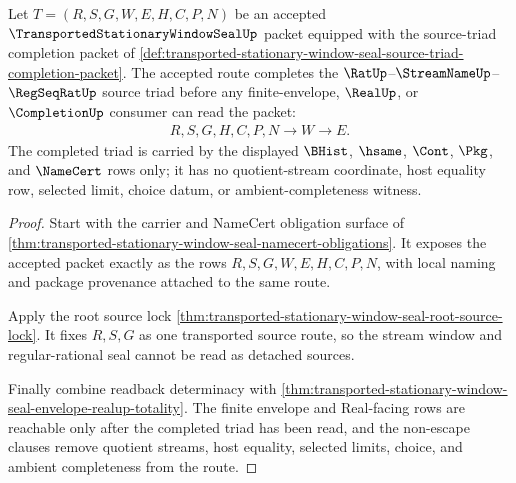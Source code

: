 \begin{theorem}
\label{thm:transported-stationary-window-seal-source-triad-completion}
Let $T=(R,S,G,W,E,H,C,P,N)$ be an accepted $\TransportedStationaryWindowSealUp$ packet equipped with the source-triad completion packet of \autoref{def:transported-stationary-window-seal-source-triad-completion-packet}. The accepted route completes the $\RatUp$--$\StreamNameUp$--$\RegSeqRatUp$ source triad before any finite-envelope, $\RealUp$, or $\CompletionUp$ consumer can read the packet:
$$
\begin{aligned}
  R,S,G,H,C,P,N
  \longrightarrow
  W
  \longrightarrow
  E .
\end{aligned}
$$
The completed triad is carried by the displayed $\BHist$, $\hsame$, $\Cont$, $\Pkg$, and $\NameCert$ rows only; it has no quotient-stream coordinate, host equality row, selected limit, choice datum, or ambient-completeness witness.
\end{theorem}
\begin{proof}
Start with the carrier and NameCert obligation surface of \autoref{thm:transported-stationary-window-seal-namecert-obligations}. It exposes the accepted packet exactly as the rows $R,S,G,W,E,H,C,P,N$, with local naming and package provenance attached to the same route.

Apply the root source lock \autoref{thm:transported-stationary-window-seal-root-source-lock}. It fixes $R,S,G$ as one transported source route, so the stream window and regular-rational seal cannot be read as detached sources.

Finally combine readback determinacy with \autoref{thm:transported-stationary-window-seal-envelope-realup-totality}. The finite envelope and Real-facing rows are reachable only after the completed triad has been read, and the non-escape clauses remove quotient streams, host equality, selected limits, choice, and ambient completeness from the route.
\end{proof}

